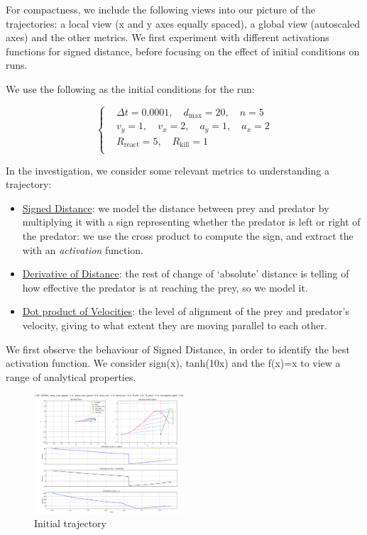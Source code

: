 \documentclass[11pt, twocolumn]{article}
\begin{document}
      For compactness, we include the following views into our picture of the trajectories: a local view (x and y axes equally spaced), a global view (autoscaled axes) and the other metrics. We first experiment with different activations functions for signed distance, before focusing on the effect of initial conditions on runs.

      We use the following as the initial conditions for the run:

      \[
        \left\{
          \begin{aligned}
            &\Delta t = 0.0001,\quad d_{\text{max}} = 20,\quad n = 5 \\
            &v_y = 1, \quad v_x = 2, \quad a_y = 1, \quad a_x = 2 \\
            &R_{\text{react}} = 5,\quad R_{\text{kill}} = 1 \\
          \end{aligned}
          \right.
        \]

        In the investigation, we consider some relevant metrics to understanding a trajectory:
        \begin{itemize}
          \item \underline{Signed Distance}: we model the distance between prey and predator by multiplying it with a sign representing whether the predator is left or right of the predator: we use the cross product to compute the sign, and extract the with an \textit{activation} function.
          \item \underline{Derivative of Distance}: the rest of change of `absolute' distance is telling of how effective the predator is at reaching the prey, so we model it.
          \item \underline{Dot product of Velocities}: the level of alignment of the prey and predator's velocity, giving to what extent they are moving parallel to each other.
        \end{itemize}

        We first observe the behaviour of Signed Distance, in order to identify the best activation function. We consider sign(x), tanh(10x) and the f(x)=x to view a range of analytical properties.

        \begin{figure}[H]
          \centering
          \includegraphics[width=0.5\textwidth]{figures/signed_distance.png}
          \caption{Initial trajectory}
          \label{fig:trajectory}
        \end{figure}
\end{document}
